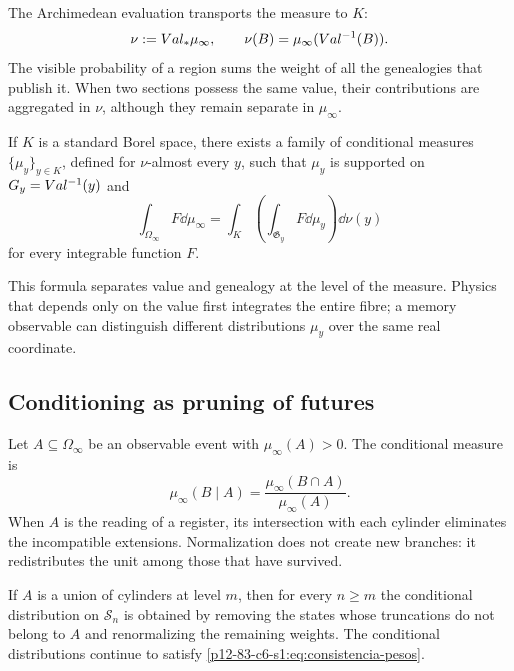 The Archimedean evaluation transports the measure to \(K\):
\begin{equation}
 \nu:=\Val_*\mu_\infty,
 \qquad
 \nu(B)=\mu_\infty(\Val^{-1}(B)).
 \label{p12-83-c6-s1:eq:pushforward-arquimediano}
\end{equation}
The visible probability of a region sums the weight of all the genealogies that
publish it. When two sections possess the same value, their contributions are
aggregated in \(\nu\), although they remain separate in \(\mu_\infty\).

\begin{proposition}
If \(K\) is a standard Borel space, there exists a family of conditional
measures \(\{\mu_y\}_{y\in K}\), defined for \(\nu\)-almost every \(y\),
such that \(\mu_y\) is supported on \(G_y=Val^{-1}(y)\) and
\[
 \int_{\Omega_\infty}F\dd\mu_\infty
 =\int_K\left(\int_{\mathfrak G_y}F\dd\mu_y\right)\dd\nu(y)
\]
for every integrable function \(F\).
\end{proposition}

This formula separates value and genealogy at the level of the measure. Physics that
depends only on the value first integrates the entire fibre; a memory observable
can distinguish different distributions \(\mu_y\) over the same
real coordinate.

\subsection{Conditioning as pruning of futures}

Let \(A\subseteq\Omega_\infty\) be an observable event with
\(\mu_\infty(A)>0\). The conditional measure is
\begin{equation}
 \mu_\infty(B\mid A)
 =\frac{\mu_\infty(B\cap A)}{\mu_\infty(A)}.
 \label{p12-83-c6-s1:eq:condicionamiento-genealogico}
\end{equation}
When \(A\) is the reading of a register, its intersection with each cylinder
eliminates the incompatible extensions. Normalization does not create new branches:
it redistributes the unit among those that have survived.

\begin{proposition}
If \(A\) is a union of cylinders at level \(m\), then for every \(n\ge m\)
the conditional distribution on \(\mathcal S_n\) is obtained by removing the
states whose truncations do not belong to \(A\) and renormalizing the remaining
weights. The conditional distributions continue to satisfy
\eqref{p12-83-c6-s1:eq:consistencia-pesos}.
\end{proposition}

